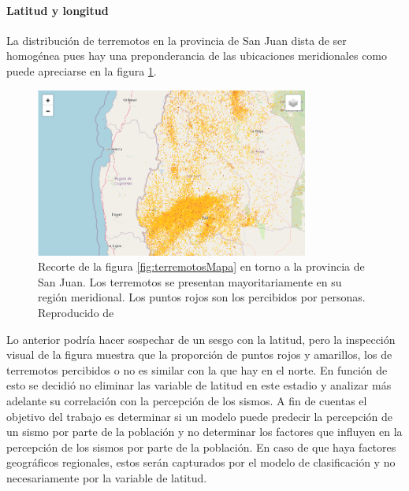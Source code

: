 \documentclass[a4paper]{report}
\begin{document}


\paragraph{Latitud y longitud}
La distribución de terremotos en la provincia de San Juan dista de ser homogénea pues hay una preponderancia de las ubicaciones meridionales como puede apreciarse en la figura \ref{fig:sanJuan}.

\begin{figure}[!ht]
	\centering
	\includegraphics[width=0.8\textwidth]{sanJuan.png}
	\caption{Recorte de la figura \ref{fig:terremotosMapa} en torno a la provincia de San Juan.
	Los terremotos se presentan mayoritariamente en su región meridional.
	Los puntos rojos son los percibidos por personas.
	Reproducido de \cite{daniela_parada_ic-datasets-docencia_nodate}}
\label{fig:sanJuan}
\end{figure}

Lo anterior podría hacer sospechar de un sesgo con la latitud, pero la inspección visual de la figura muestra que la proporción de puntos rojos y amarillos, los de terremotos percibidos o no es similar con la que hay en el norte.
En función de esto se decidió no eliminar las variable de latitud en este estadio y analizar más adelante su correlación con la percepción de los sismos.
A fin de cuentas el objetivo del trabajo es determinar si un modelo puede predecir la percepción de un sismo por parte de la población y no determinar los factores que influyen en la percepción de los sismos por parte de la población.
En caso de que haya factores geográficos regionales, estos serán capturados por el modelo de clasificación y no necesariamente por la variable de latitud.
\end{document}
